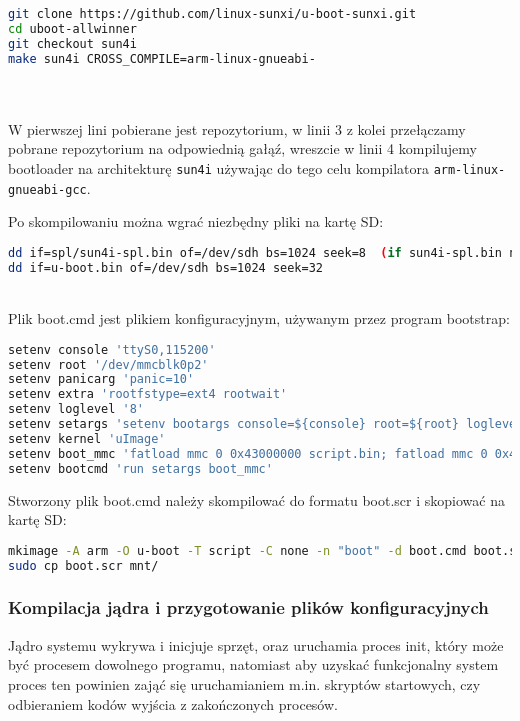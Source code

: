 \begin{lstlisting}[language=bash]
git clone https://github.com/linux-sunxi/u-boot-sunxi.git
cd uboot-allwinner
git checkout sun4i
make sun4i CROSS_COMPILE=arm-linux-gnueabi-
\end{lstlisting}

\\
\\
W pierwszej lini pobierane jest repozytorium, w linii 3 z kolei przełączamy pobrane repozytorium na odpowiednią gałąź, wreszcie w linii 4 kompilujemy bootloader na architekturę \lstinline|sun4i| używając do tego celu kompilatora \lstinline|arm-linux-gnueabi-gcc|.

Po skompilowaniu można wgrać niezbędny pliki na kartę SD:

\begin{lstlisting}[language=bash]
dd if=spl/sun4i-spl.bin of=/dev/sdh bs=1024 seek=8  (if sun4i-spl.bin not found, try sunxi-spl.bin)
dd if=u-boot.bin of=/dev/sdh bs=1024 seek=32
\end{lstlisting}
\\

Plik boot.cmd jest plikiem konfiguracyjnym, używanym przez program bootstrap:

\begin{lstlisting}[language=bash]
setenv console 'ttyS0,115200'
setenv root '/dev/mmcblk0p2'
setenv panicarg 'panic=10'
setenv extra 'rootfstype=ext4 rootwait'
setenv loglevel '8'
setenv setargs 'setenv bootargs console=${console} root=${root} loglevel=${loglevel} ${panicarg} ${extra}'
setenv kernel 'uImage'
setenv boot_mmc 'fatload mmc 0 0x43000000 script.bin; fatload mmc 0 0x48000000 ${kernel}; bootm 0x48000000'
setenv bootcmd 'run setargs boot_mmc'
\end{lstlisting}

Stworzony plik boot.cmd należy skompilować do formatu boot.scr i skopiować na kartę SD:

\begin{lstlisting}[language=bash]
mkimage -A arm -O u-boot -T script -C none -n "boot" -d boot.cmd boot.scr
sudo cp boot.scr mnt/
\end{lstlisting}


\subsubsection{Kompilacja jądra i przygotowanie plików konfiguracyjnych}

Jądro systemu wykrywa i inicjuje sprzęt, oraz uruchamia proces init, który może być procesem dowolnego programu, natomiast aby uzyskać funkcjonalny system proces ten powinien zająć się uruchamianiem m.in. skryptów startowych, czy odbieraniem kodów wyjścia z zakończonych procesów.

